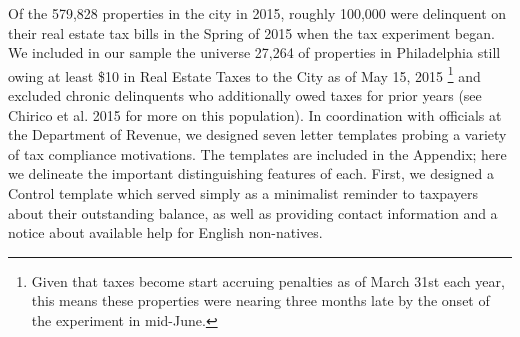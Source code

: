 \documentclass[12pt,titlepage]{article}
\begin{document}
%

Of the 579,828 properties in the city in 2015, roughly 100,000 were
delinquent on their real estate tax bills in the Spring of 2015 when
the tax experiment began. We included in our sample the universe 27,264
of properties in Philadelphia still owing at least \$10 in Real Estate
Taxes to the City as of May 15, 2015
\footnote{
	Given that taxes become start accruing penalties as of 
	March 31st each year, this means these properties were 
	nearing three months late by the onset of the 
	experiment in mid-June.
}
and excluded chronic delinquents who additionally owed taxes for 
prior years (see Chirico et al. 2015 for more on this population). 
In coordination with officials at the Department of Revenue, we designed 
seven letter templates probing a variety of tax compliance motivations. 
The templates are included in the Appendix; here we delineate the important 
distinguishing features of each. First, we designed a Control template which 
served simply as a minimalist reminder to taxpayers about their outstanding 
balance, as well as providing contact information and a notice about 
available help for English non-natives.
\end{document}
